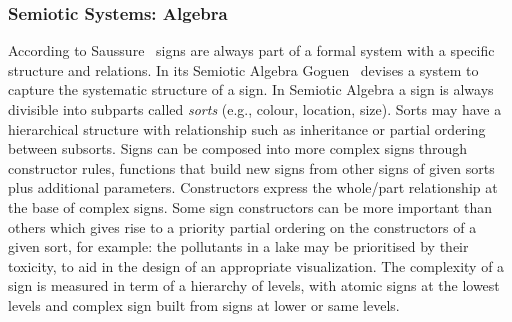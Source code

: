 \subsubsection{Semiotic Systems: Algebra}

According to Saussure~\cite{Saussure1983} signs are always part of a formal system with a specific structure and relations. In its Semiotic Algebra Goguen~\cite{Goguen2003} devises a system to capture the systematic structure of a sign.
In Semiotic Algebra a sign is always divisible into subparts called \emph{sorts} (e.g., colour, location, size). Sorts may have a hierarchical structure with relationship such as inheritance or partial ordering between subsorts. 
Signs can be composed into more complex signs through constructor rules, functions that build new signs from other signs of given sorts plus additional parameters. Constructors express the whole/part relationship at the base of complex signs. 
Some sign constructors can be more important than others which gives rise to a priority partial ordering on the constructors of a given sort,  for example: the pollutants in a lake may be prioritised by their toxicity, to aid in the design of an appropriate visualization. 
The complexity of a sign is measured in term of a hierarchy of levels, with atomic signs at the lowest levels and complex sign built from signs at lower or same levels.


